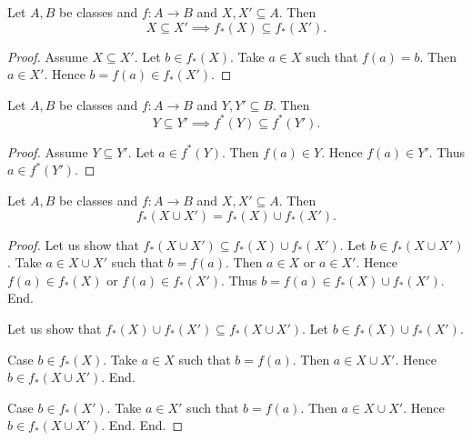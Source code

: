 \documentclass[../set-theory.tex]{subfiles}
\begin{document}
  \begin{forthel}
    \begin{proposition}
      Let $A, B$ be classes and $f : A \to B$ and $X, X' \subseteq A$.
      Then \[ X \subseteq X' \implies f_{*}(X) \subseteq f_{*}(X'). \]
    \end{proposition}
    \begin{proof}
      Assume $X \subseteq X'$.
      Let $b \in f_{*}(X)$.
      Take $a \in X$ such that $f(a) = b$.
      Then $a \in X'$.
      Hence $b = f(a) \in f_{*}(X')$.
    \end{proof}
  \end{forthel}

  \begin{forthel}
    \begin{proposition}
      Let $A, B$ be classes and $f : A \to B$ and $Y, Y' \subseteq B$.
      Then \[ Y \subseteq Y' \implies f^{*}(Y) \subseteq f^{*}(Y'). \]
    \end{proposition}
    \begin{proof}
      Assume $Y \subseteq Y'$.
      Let $a \in f^{*}(Y)$.
      Then $f(a) \in Y$.
      Hence $f(a) \in Y'$.
      Thus $a \in f^{*}(Y')$.
    \end{proof}
  \end{forthel}

  \begin{forthel}
    \begin{proposition}
      Let $A, B$ be classes and $f : A \to B$ and $X, X' \subseteq A$.
      Then \[ f_{*}(X \cup X') = f_{*}(X) \cup f_{*}(X'). \]
    \end{proposition}
    \begin{proof}
      Let us show that $f_{*}(X \cup X') \subseteq f_{*}(X) \cup f_{*}(X')$.
        Let $b \in f_{*}(X \cup X')$.
        Take $a \in X \cup X'$ such that $b = f(a)$.
        Then $a \in X$ or $a \in X'$.
        Hence $f(a) \in f_{*}(X)$ or $f(a) \in f_{*}(X')$.
        Thus $b = f(a) \in f_{*}(X) \cup f_{*}(X')$.
      End.

      Let us show that $f_{*}(X) \cup f_{*}(X') \subseteq f_{*}(X \cup X')$.
        Let $b \in f_{*}(X) \cup f_{*}(X')$.

        Case $b \in f_{*}(X)$.
          Take $a \in X$ such that $b = f(a)$.
          Then $a \in X \cup X'$.
          Hence $b \in f_{*}(X \cup X')$.
        End.

        Case $b \in f_{*}(X')$.
          Take $a \in X'$ such that $b = f(a)$.
          Then $a \in X \cup X'$.
          Hence $b \in f_{*}(X \cup X')$.
        End.
      End.
    \end{proof}
  \end{forthel}
\end{document}
